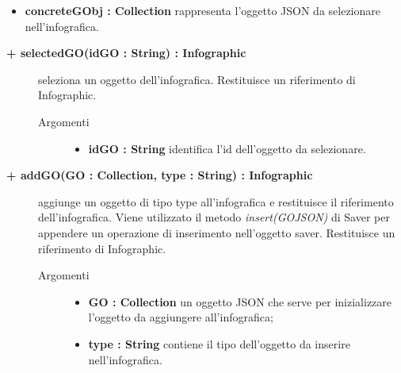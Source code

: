\begin{description}
\begin{description}
\begin{description}
\begin{itemize}
					\item \textbf{concreteGObj : Collection			} \hfill
					rappresenta l'oggetto JSON da selezionare nell'infografica.
				\end{itemize}
		\end{description}

\end{description}

\begin{description}
		\item[\textbf{\color{blue}+ selectedGO(idGO : String) : Infographic			}] \hfill
			seleziona un oggetto dell'infografica. Restituisce un riferimento di Infographic.

		\begin{description}
			\item[Argomenti] \hfill
				\begin{itemize}
				
					\item \textbf{idGO : String			} \hfill
					identifica l'id dell'oggetto da selezionare.
				\end{itemize}
		\end{description}

\end{description}

\begin{description}
		\item[\textbf{\color{blue}+ addGO(GO : Collection, type : String) : Infographic			}] \hfill
			aggiunge un oggetto di tipo type all'infografica e restituisce il riferimento dell'infografica. Viene utilizzato il metodo \textit{insert(GOJSON)} di Saver per appendere un operazione di inserimento nell'oggetto saver. Restituisce un riferimento di Infographic. 

\begin{description}
			\item[Argomenti] \hfill
				\begin{itemize}
						\item \textbf{GO : Collection			} \hfill
					un oggetto JSON che serve per inizializzare l'oggetto da aggiungere all'infografica;
					  	\item \textbf{type : String			} \hfill
					  	contiene il tipo dell'oggetto da inserire nell'infografica.
				\end{itemize}

\end{description}


\end{description}
\end{description}
